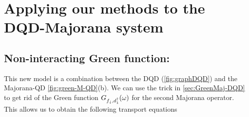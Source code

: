 \section{Applying our methods to the DQD-Majorana system}



\subsection{Non-interacting Green function:}

This new model is a combination between the DQD  (\ref{fig:graphDQD}) and the Majorana-QD  \ref{fig:green-M-QD}(b). We can use the trick in \ref{sec:GreenMaj-DQD} to get rid of the Green function $G_{f_\downarrow,d^\dagger_1}(\omega)$ for the second Majorana operator. This allows us to obtain the following transport equations 
 
 
 
 
